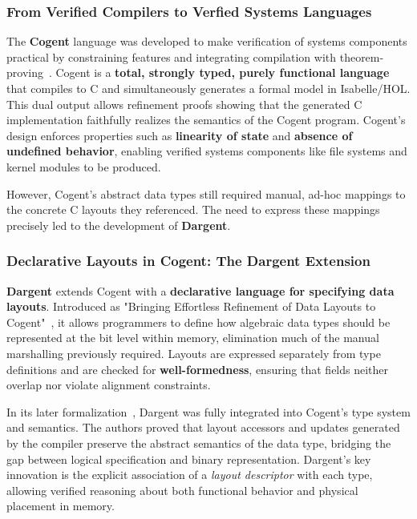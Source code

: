 \subsubsection{From Verified Compilers to Verfied Systems Languages}

The \textbf{Cogent} language was developed to make verification of systems
components practical by constraining features and integrating compilation with
theorem-proving~\autocite{cogent1}. Cogent is a \textbf{total, strongly
typed, purely functional language} that compiles to C and simultaneously
generates a formal model in Isabelle/HOL. This dual output allows
refinement proofs showing that the generated C implementation faithfully
realizes the semantics of the Cogent program. Cogent's design enforces
properties such as \textbf{linearity of state} and \textbf{absence of
undefined behavior}, enabling verified systems components like file systems
and kernel modules to be produced.

However, Cogent's abstract data types still required manual, ad-hoc mappings to
the concrete C layouts they referenced. The need to express these mappings
precisely led to the development of \textbf{Dargent}.

\subsubsection{Declarative Layouts in Cogent: The Dargent Extension}
\textbf{Dargent} extends Cogent with a \textbf{declarative language for
specifying data layouts}. Introduced as "Bringing Effortless Refinement
of Data Layouts to Cogent"~\autocite{dargent_isola}, it allows programmers
to define how algebraic data types should be represented at the bit level 
within memory, elimination much of the manual marshalling previously
required. Layouts are expressed separately from type definitions and are
checked for \textbf{well-formedness}, ensuring that fields neither overlap
nor violate alignment constraints. 

In its later formalization~\autocite{dargent}, Dargent was fully integrated
into Cogent's type system and semantics. The authors proved that 
layout accessors and updates generated by the compiler preserve the
abstract semantics of the data type, bridging the gap between logical
specification and binary representation. Dargent's key innovation is the
explicit association of a \textit{layout descriptor} with each type,
allowing verified reasoning about both functional behavior and physical
placement in memory.


